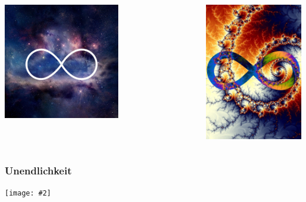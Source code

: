 \documentclass[12pt,utf8,notheorems,compress]{beamer}
\newcommand{\imgslide}[2]{
  \begin{frame}\frametitle{#1}
    \centering
    \texttt{[image: \#2]}
    \par
  \end{frame}
}
\begin{document}
\begin{frame}
\begin{columns}[c]
\begin{column}{0.5\textwidth}
      \includegraphics[width=0.6\textwidth]{infinity-space}
    \end{column}
    \begin{column}{0.5\textwidth}
      \includegraphics[height=0.8\textheight]{infinity-fractal}
    \end{column}
  \end{columns}
\end{frame}

\imgslide{Unendlichkeit}{infinity-mirrors}
\end{document}
